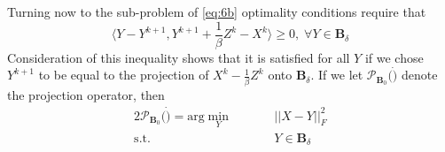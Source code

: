 \documentclass{article}
\begin{document}
Turning now to the sub-problem of \ref{eq:6b} optimality conditions require that
\begin{equation} \label{eq:9}
\langle Y - Y^{k+1}, Y^{k+1} + \frac 1 \beta Z^k - X^k \rangle \ge 0, \; \forall Y \in \textbf{B}_\delta
\end{equation}
Consideration of this inequality shows that it is satisfied for all $Y$ if we chose $Y^{k+1}$ to be equal to the projection of $X^k - \frac 1 \beta Z^k$  onto $\textbf{B}_\delta$.  If we let $\mathcal{P}_{\textbf{B}_0}(\dot)$ denote the projection operator, then 
\begin{alignat}{2} \label{eq:10}
\mathcal{P}_{\textbf{B}_0}(\dot) = \textrm{arg} \min_Y & \quad &&||X-Y||^2_F \\
\textrm{s.t.}& &&Y \in \textbf{B}_\delta \nonumber
\end{alignat}




 
\end{document}
